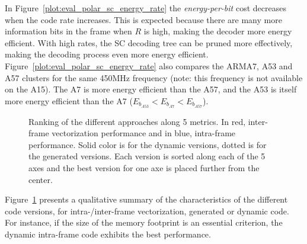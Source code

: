 In Figure~\ref{plot:eval_polar_sc_energy_rate} the \emph{energy-per-bit} cost
decreases when the code rate increases. This is expected because there are many
more information bits in the frame when $R$ is high, making the decoder more
energy efficient. With high rates, the SC decoding tree can be pruned more
effectively, making the decoding process even more energy efficient.
Figure~\ref{plot:eval_polar_sc_energy_rate} also compares the ARM\R A7, A53 and
A57 clusters for the same 450MHz frequency (note: this frequency is not
available on the A15). The \little A7 is more energy efficient than the \big
A57, and the \little A53 is itself more energy efficient than the \little A7
($E_{b_{A53}} < E_{b_{A7}} < E_{b_{A57}}$).

\begin{figure}[htp]
  \centering
  \caption{\label{fig:eval_polar_sc_colgate}Ranking of the different approaches
    along 5 metrics. In red, inter-frame vectorization performance and in blue,
    intra-frame performance. Solid color is for the dynamic versions, dotted is
    for the generated versions. Each version is sorted along each of the 5 axes
    and the best version for one axe is placed further from the center.}
\end{figure}

Figure~\ref{fig:eval_polar_sc_colgate} presents a qualitative summary of the
characteristics of the different code versions, for intra-/inter-frame
vectorization, generated or dynamic code. For instance, if the size of
the memory footprint is an essential criterion, the dynamic intra-frame
code exhibits the best performance.

